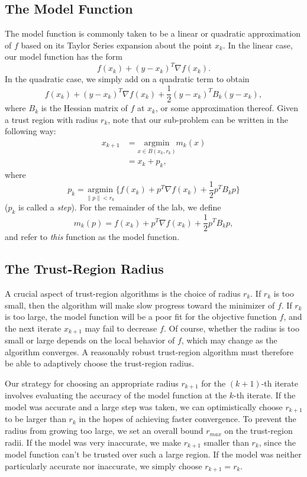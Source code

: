 \subsection*{The Model Function}
The model function is commonly taken to be a linear or quadratic approximation of
$f$ based on its Taylor Series expansion about the point $x_k$. In the linear case,
our model function has the form
\[
f(x_k) + (y-x_k)^T \nabla f(x_k).
\]
In the quadratic case, we simply add on a quadratic term to obtain
\[
f(x_k) + (y-x_k)^T \nabla f(x_k) + \frac{1}{2}(y - x_k)^T B_k (y-x_k),
\]
where $B_k$ is the Hessian matrix of $f$ at $x_k$, or some approximation thereof.
Given a trust region with radius $r_k$, note that our sub-problem can be
written in the following way:
\begin{align*}
x_{k+1} &= \underset{x \in B(x_k, r_k)}{\text{argmin}} m_k(x)\\
&= x_k + p_k,
\end{align*}
where
\begin{equation}
p_k = \underset{\|p\| < r_k}{\text{argmin}}\, \{f(x_k) + p^T \nabla f(x_k) + \frac{1}{2}p^T B_k p\}
\label{eq:step}
\end{equation}
($p_k$ is called a \emph{step}).
For the remainder of the lab, we define
\[
m_k(p) = f(x_k) + p^T \nabla f(x_k) + \frac{1}{2}p^T B_k p,
\]
and refer to \emph{this} function as the model function.

\subsection*{The Trust-Region Radius}
A crucial aspect of trust-region algorithms is the choice of radius $r_k$. If $r_k$ is too small, then the algorithm will
make slow progress toward the minimizer of $f$. If $r_k$ is too large, the model function will be a poor fit for the objective
function $f$, and the next iterate $x_{k+1}$ may fail to decrease $f$. 
Of course, whether the radius is too small or large depends on the local behavior of $f$, which may change as the algorithm
converges. A reasonably robust trust-region algorithm must therefore be able to adaptively choose the trust-region radius.

Our strategy for choosing an appropriate radius $r_{k+1}$ for the $(k+1)$-th iterate involves evaluating the accuracy
of the model function at the $k$-th iterate. If the model was accurate and a large step was taken, we can optimistically choose $r_{k+1}$ to be larger
than $r_k$ in the hopes of achieving faster convergence. 
To prevent the radius from growing too large, we set an overall bound $r_{max}$ on the trust-region radii.
If the model was very inaccurate, we make $r_{k+1}$ smaller than
$r_k$, since the model function can't be trusted over such a large region. If the model was neither particularly accurate
nor inaccurate, we simply choose $r_{k+1} = r_k$. 

